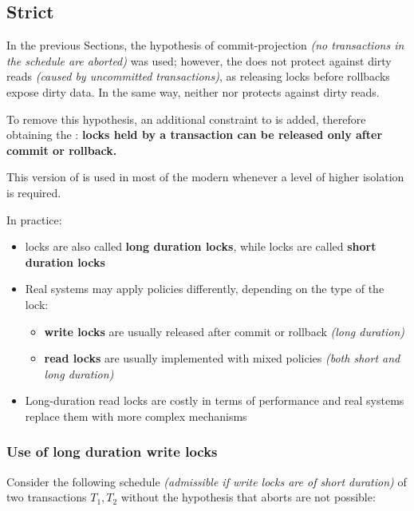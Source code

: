 \documentclass[english]{article}
\begin{document}
\subsection{Strict \tpl}

In the previous Sections, the hypothesis of commit-projection \textit{(no transactions in the schedule are aborted)} was used;
however, the \tpl does not protect against dirty reads \textit{(caused by uncommitted transactions)}, as releasing locks before rollbacks expose dirty data.
In the same way, neither \vsr nor \csr protects against dirty reads.

To remove this hypothesis, an additional constraint to \tpl is added, therefore obtaining the \textbf{\stpl}:
\textbf{locks held by a transaction can be released only after commit or rollback.}

This version of \tpl is used in most of the modern \dbms whenever a level of higher isolation is required.

\bigskip
In practice:
\begin{itemize}
  \item \stpl locks are also called \textbf{long duration locks}, while \tpl locks are called \textbf{short duration locks}
  \item Real systems may apply \tpl policies differently, depending on the type of the lock:
        \begin{itemize}
          \item \textbf{write locks} are usually released after commit or rollback \textit{(long duration)}
          \item \textbf{read locks} are usually implemented with mixed policies \textit{(both short and long duration)}
        \end{itemize}
  \item Long-duration read locks are costly in terms of performance and real systems replace them with more complex mechanisms
\end{itemize}

\subsubsection{Use of long duration write locks}

Consider the following schedule \textit{(admissible if write locks are of short duration)} of two transactions \(T_1, T_2\) without the hypothesis that aborts are not possible:
\end{document}
